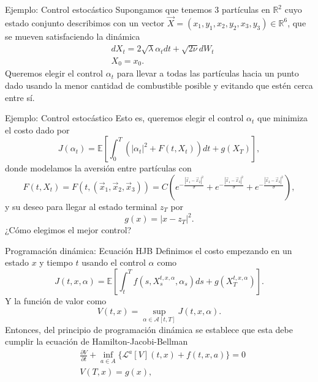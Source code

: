 \documentclass[aspectratio=169,xcolor=dvipsnames]{beamer}
\newcommand{\bbR}{\mathbb{R}}
\newcommand{\dpartial}[2]{\frac{\partial #1}{\partial #2}}
\begin{document}
\begin{frame}{Ejemplo: Control estocástico}
	Supongamos que tenemos 3 partículas en $\bbR^2$ cuyo estado conjunto describimos con un vector $\vec{X}=(x_1,y_1,x_2,y_2,x_3,y_3)\in \bbR^6$, que se mueven satisfaciendo la dinámica
	\begin{equation}
		\begin{split}
			&dX_t=2\sqrt{\lambda}\alpha_t dt+\sqrt{2\nu}dW_t\\
			&X_0=x_0.
		\end{split} 
	\end{equation} 
	Queremos elegir el control $\alpha_t$ para llevar a todas las partículas hacia un punto dado usando la menor cantidad de combustible posible y evitando que estén cerca entre sí.
\end{frame}

\begin{frame}{Ejemplo: Control estocástico}
	Esto es, queremos elegir el control $\alpha_t$ que minimiza el costo dado por 
	\begin{equation}
		J(\alpha_t)=\mathbb{E}\left[\int_{0}^{T}(|\alpha_t|^2+F(t,X_t)) dt +g(X_T)\right],
	\end{equation}   
	donde modelamos la aversión entre partículas con
	\begin{equation}
		F(t,X_t)=F(t,(\vec{x}_1,\vec{x}_2,\vec{x}_3))=C\left(e^{-\frac{|\vec{x}_1-\vec{x}_2|^2}{\sigma}}+e^{-\frac{|\vec{x}_1-\vec{x}_3|^2}{\sigma}}+e^{-\frac{|\vec{x}_2-\vec{x}_3|^2}{\sigma}}\right),
	\end{equation}
	y su deseo para llegar al estado terminal $z_T$ por 
\begin{equation}
	g(x)=|x-z_T|^2.
\end{equation}
¿Cómo elegimos el mejor control?
\end{frame}

\begin{frame}{Programación dinámica: Ecuación HJB}
	Definimos el costo empezando en un estado $x$ y tiempo $t$ usando el control $\alpha$ como
	\begin{equation}
		J(t,x,\alpha)=\mathbb{E}\left[\int_{t}^{T}f(s,X_s^{t,x,\alpha},\alpha_s) ds +g(X_T^{t,x,\alpha})\right].
	\end{equation}
Y la función de valor como
\begin{equation}
	V(t,x)=\sup_{\alpha\in\mathcal{A}[t,T]}J(t,x,\alpha).
\end{equation}
Entonces, del principio de programación dinámica se establece que esta debe cumplir la ecuación de Hamilton-Jacobi-Bellman 
\begin{equation}
	\begin{split}
		&\dpartial{V}{t}+\inf_{a\in A}\{\mathcal{L}^a[V](t,x)+f(t,x,a)\}=0\\
		&V(T,x)=g(x),
	\end{split}
\end{equation}
\end{frame}
\end{document}

